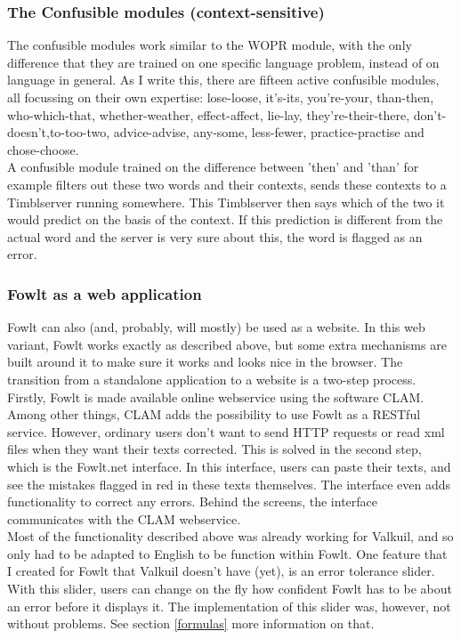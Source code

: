 \documentclass[12pt]{article}
\begin{document}
\subsubsection{The Confusible modules (context-sensitive)}
The confusible modules work similar to the WOPR module, with the only difference that they are trained on one specific language problem, instead of on language in general. As I write this, there are fifteen active confusible modules, all focussing on their own expertise: lose-loose, it's-its, you're-your, than-then, who-which-that, whether-weather, effect-affect, lie-lay, they're-their-there, don't-doesn't,to-too-two, advice-advise, any-some, less-fewer, practice-practise and chose-choose.
\\\indent
A confusible module trained on the difference between 'then' and 'than' for example filters out these two words and their contexts, sends these contexts to a Timblserver running somewhere. This Timblserver then says which of the two it would predict on the basis of the context. If this prediction is different from the actual word and the server is very sure about this, the word is flagged as an error.

\subsubsection{Fowlt as a web application}
Fowlt can also (and, probably, will mostly) be used as a website. In this web variant, Fowlt works exactly as described above, but some extra mechanisms are built around it to make sure it works and looks nice in the browser. The transition from a standalone application to a website is a two-step process. Firstly, Fowlt is made available online webservice using the software CLAM. Among other things, CLAM adds the possibility to use Fowlt as a RESTful service. However, ordinary users don't want to send HTTP requests or read xml files when they want their texts corrected. This is solved in the second step, which is the Fowlt.net interface. In this interface, users can paste their texts, and see the mistakes flagged in red in these texts themselves. The interface even adds functionality to correct any errors. Behind the screens, the interface communicates with the CLAM webservice.
\\\indent
Most of the functionality described above was already working for Valkuil, and so only had to be adapted to English to be function within Fowlt. One feature that I created for Fowlt that Valkuil doesn't have (yet), is an error tolerance slider. With this slider, users can change on the fly how confident Fowlt has to be about an error before it displays it. The implementation of this slider was, however, not without problems. See section \ref{formulas} more information on that.
\end{document}
